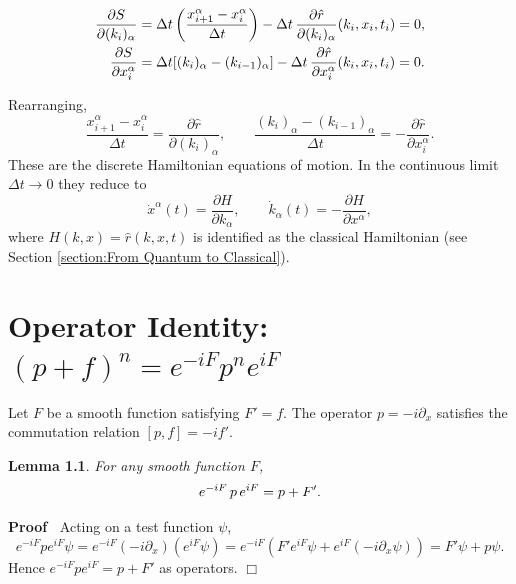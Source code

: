 \documentclass{book}
\newenvironment{proof}{\noindent\textbf{Proof\ }}{\hspace*{\fill}$\Box$\medskip}
\newtheorem{lemma}{Lemma}
\begin{document}
\begin{align*}
  \frac{\partial S}{\partial (k_i)_{\alpha}} & = \Delta t \left( \frac{x_{i +
  1}^{\alpha} - x_i^{\alpha}}{\Delta t} \right) - \Delta t \hspace{0.17em}
  \frac{\partial \hat{r}}{\partial (k_i)_{\alpha}}  (k_i, x_i, t_i) = 0,\\
  \frac{\partial S}{\partial x_i^{\alpha}} & = \Delta t [(k_i)_{\alpha} -
  (k_{i - 1})_{\alpha}] - \Delta t \hspace{0.17em} \frac{\partial
  \hat{r}}{\partial x_i^{\alpha}}  (k_i, x_i, t_i) = 0.
\end{align*}

Rearranging,
\[ \frac{x_{i + 1}^{\alpha} - x_i^{\alpha}}{\Delta t} = \frac{\partial
   \hat{r}}{\partial (k_i)_{\alpha}}, \qquad \frac{(k_i)_{\alpha} - (k_{i -
   1})_{\alpha}}{\Delta t} = - \frac{\partial \hat{r}}{\partial x_i^{\alpha}}
   . \]
These are the discrete Hamiltonian equations of motion. In the continuous
limit $\Delta t \to 0$ they reduce to
\[ \dot{x}^{\alpha} (t) = \frac{\partial H}{\partial k_{\alpha}}, \qquad
   \dot{k}_{\alpha} (t) = - \frac{\partial H}{\partial x^{\alpha}}, \]
where $H (k, x) = \hat{r}  (k, x, t)$ is identified as the classical
Hamiltonian (see Section \ref{section:From Quantum to Classical}).

\chapter{Operator Identity: $(p + f)^n = e^{- iF} p^n
e^{iF}$}\label{appendix:operator-identity}

Let $F$ be a smooth function satisfying $F' = f$. The operator $p = - i
\partial_x$ satisfies the commutation relation $[p, f] = - if'$.

\begin{lemma}
  For any smooth function $F$,
  \begin{equation}
    e^{- iF}  \hspace{0.17em} p \hspace{0.17em} e^{iF} = p + F' .
    \label{eq:sim-transform}
  \end{equation}
\end{lemma}

\begin{proof}
  Acting on a test function $\psi$,
  \[ e^{- iF} pe^{iF} \psi = e^{- iF}  (- i \partial_x)  (e^{iF} \psi) = e^{-
     iF}  (F' e^{iF} \psi + e^{iF} (- i \partial_x \psi)) = F' \psi + p \psi .
  \]
  Hence $e^{- iF} pe^{iF} = p + F'$ as operators.
\end{proof}
\end{document}
